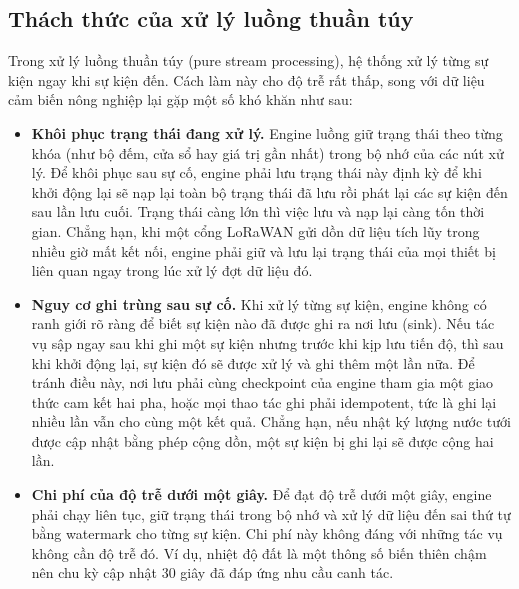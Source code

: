 \subsection{Thách thức của xử lý luồng thuần túy}
\label{sec:2-challenges}

Trong xử lý luồng thuần túy (pure stream processing), hệ thống xử lý từng sự kiện ngay khi sự kiện đến. Cách làm này cho độ trễ rất thấp, song với dữ liệu cảm biến nông nghiệp lại gặp một số khó khăn như sau:

\begin{itemize}
  \item \textbf{Khôi phục trạng thái đang xử lý.} Engine luồng giữ trạng thái theo từng khóa (như bộ đếm, cửa sổ hay giá trị gần nhất) trong bộ nhớ của các nút xử lý. Để khôi phục sau sự cố, engine phải lưu trạng thái này định kỳ để khi khởi động lại sẽ nạp lại toàn bộ trạng thái đã lưu rồi phát lại các sự kiện đến sau lần lưu cuối. Trạng thái càng lớn thì việc lưu và nạp lại càng tốn thời gian. Chẳng hạn, khi một cổng LoRaWAN gửi dồn dữ liệu tích lũy trong nhiều giờ mất kết nối, engine phải giữ và lưu lại trạng thái của mọi thiết bị liên quan ngay trong lúc xử lý đợt dữ liệu đó.
  \item \textbf{Nguy cơ ghi trùng sau sự cố.} Khi xử lý từng sự kiện, engine không có ranh giới rõ ràng để biết sự kiện nào đã được ghi ra nơi lưu (sink). Nếu tác vụ sập ngay sau khi ghi một sự kiện nhưng trước khi kịp lưu tiến độ, thì sau khi khởi động lại, sự kiện đó sẽ được xử lý và ghi thêm một lần nữa. Để tránh điều này, nơi lưu phải cùng checkpoint của engine tham gia một giao thức cam kết hai pha, hoặc mọi thao tác ghi phải idempotent, tức là ghi lại nhiều lần vẫn cho cùng một kết quả. Chẳng hạn, nếu nhật ký lượng nước tưới được cập nhật bằng phép cộng dồn, một sự kiện bị ghi lại sẽ được cộng hai lần.
  \item \textbf{Chi phí của độ trễ dưới một giây.} Để đạt độ trễ dưới một giây, engine phải chạy liên tục, giữ trạng thái trong bộ nhớ và xử lý dữ liệu đến sai thứ tự bằng watermark cho từng sự kiện. Chi phí này không đáng với những tác vụ không cần độ trễ đó. Ví dụ, nhiệt độ đất là một thông số biến thiên chậm nên chu kỳ cập nhật 30 giây đã đáp ứng nhu cầu canh tác.
\end{itemize}
